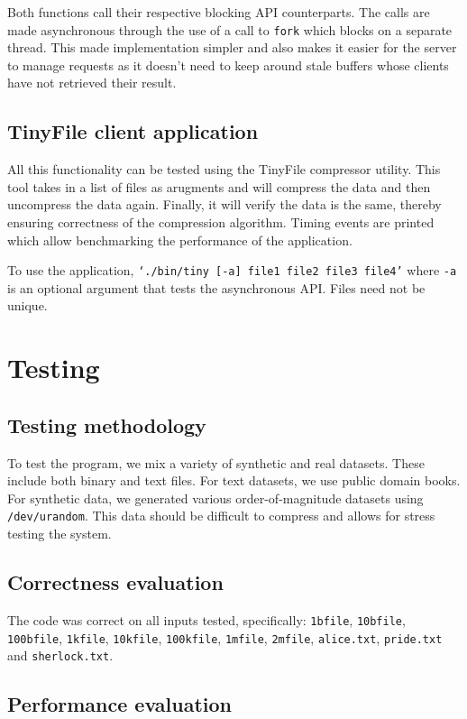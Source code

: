 \documentclass[paper=a4,fontsize=11pt]{report} %
\numberwithin{equation}{section} %
\numberwithin{figure}{section} %
\numberwithin{table}{section} %
\begin{document}
Both functions call their respective blocking API counterparts. The calls are made asynchronous through the use of a call to \texttt{fork} which blocks on a separate thread. This made implementation simpler and also makes it easier for the server to manage requests as it doesn't need to keep around stale buffers whose clients have not retrieved their result.


\subsection{TinyFile client application}

All this functionality can be tested using the TinyFile compressor utility. This tool takes in a list of files as arugments and will compress the data and then uncompress the data again. Finally, it will verify the data is the same, thereby ensuring correctness of the compression algorithm. Timing events are printed which allow benchmarking the performance of the application.

To use the application, \texttt{`./bin/tiny [-a] file1 file2 file3 file4'} where \texttt{-a} is an optional argument that tests the asynchronous API. Files need not be unique.

\section{Testing}

\subsection{Testing methodology}
To test the program, we mix a variety of synthetic and real datasets. These include both binary and text files. For text datasets, we use public domain books. For synthetic data, we generated various order-of-magnitude datasets using \texttt{/dev/urandom}. This data should be difficult to compress and allows for stress testing the system.

\subsection{Correctness evaluation}
The code was correct on all inputs tested, specifically: \texttt{1bfile}, \texttt{10bfile}, \texttt{100bfile}, \texttt{1kfile}, \texttt{10kfile}, \texttt{100kfile}, \texttt{1mfile}, \texttt{2mfile}, \texttt{alice.txt}, \texttt{pride.txt} and \texttt{sherlock.txt}.

\subsection{Performance evaluation}
\end{document}

